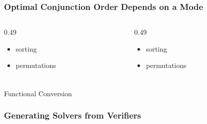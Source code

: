 \documentclass[xcolor={dvipsnames}, aspectratio=169]{beamer}
\newcommand{\happyCheck}{\color{green}{\checkmark}}
\newcommand{\timeout}{\color{red}{\clock}}
\begin{document}
\begin{frame}[fragile]
  \frametitle{Optimal Conjunction Order Depends on a Mode}
\begin{columns}
  \begin{column}[t]{0.49\textwidth}
    

    \vfill

    \begin{center}
      \begin{minipage}{0.4\textwidth}
        \begin{itemize}
          \item[\happyCheck] sorting
          \item[\timeout] permutations
        \end{itemize}
      \end{minipage}
    \end{center}

  \end{column}
  \begin{column}[t]{0.49\textwidth}
     

    \vfill

    \begin{center}
      \begin{minipage}{0.4\textwidth}
        \begin{itemize}
          \item[\timeout] sorting
          \item[\happyCheck] permutations
        \end{itemize}
      \end{minipage}
    \end{center}


  \end{column}
\end{columns}
\end{frame}

\begin{frame}[fragile]
  \frametitle{}
\begin{center}
  \LARGE Functional Conversion
\end{center}
\end{frame}

\begin{frame}[fragile]
  \frametitle{Generating Solvers from Verifiers}



\end{frame}
\end{document}
